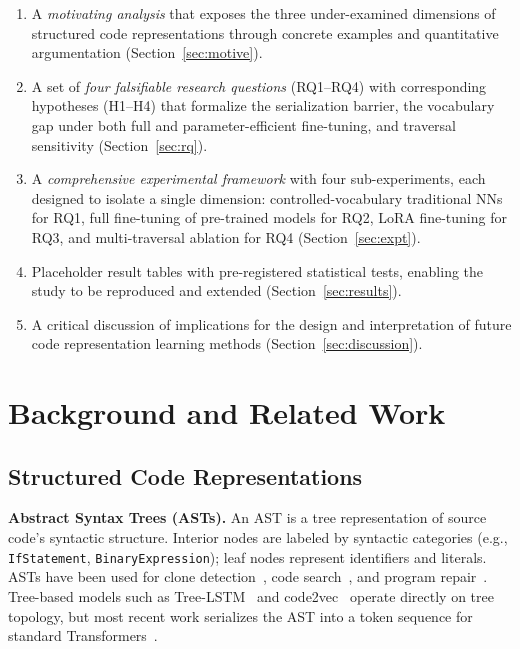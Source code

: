 \documentclass[pdflatex,sn-mathphys,Numbered]{sn-jnl}
\begin{document}
\begin{enumerate}
\item A \emph{motivating analysis} that exposes the three under-examined dimensions of structured code representations through concrete examples and quantitative argumentation (Section~\ref{sec:motive}).

\item A set of \emph{four falsifiable research questions} (RQ1--RQ4) with corresponding hypotheses (H1--H4) that formalize the serialization barrier, the vocabulary gap under both full and parameter-efficient fine-tuning, and traversal sensitivity (Section~\ref{sec:rq}).

\item A \emph{comprehensive experimental framework} with four sub-experiments, each designed to isolate a single dimension: controlled-vocabulary traditional NNs for RQ1, full fine-tuning of pre-trained models for RQ2, LoRA fine-tuning for RQ3, and multi-traversal ablation for RQ4 (Section~\ref{sec:expt}).

\item Placeholder result tables with pre-registered statistical tests, enabling the study to be reproduced and extended (Section~\ref{sec:results}).

\item A critical discussion of implications for the design and interpretation of future code representation learning methods (Section~\ref{sec:discussion}).
\end{enumerate}

\section{Background and Related Work}\label{sec:related}

\subsection{Structured Code Representations}

\textbf{Abstract Syntax Trees (ASTs).} An AST is a tree representation of source code's syntactic structure. Interior nodes are labeled by syntactic categories (e.g., \texttt{IfStatement}, \texttt{BinaryExpression}); leaf nodes represent identifiers and literals. ASTs have been used for clone detection~\citep{baxter1998clone,jiang2007deckard,koschke2006survey}, code search~\citep{gu2018deepcs}, and program repair~\citep{chen2019sequencer}. Tree-based models such as Tree-LSTM~\citep{tai2015treelstm} and code2vec~\citep{alon2019code2vec} operate directly on tree topology, but most recent work serializes the AST into a token sequence for standard Transformers~\citep{zhang2019astnn,wang2020detecting}.
\end{document}

